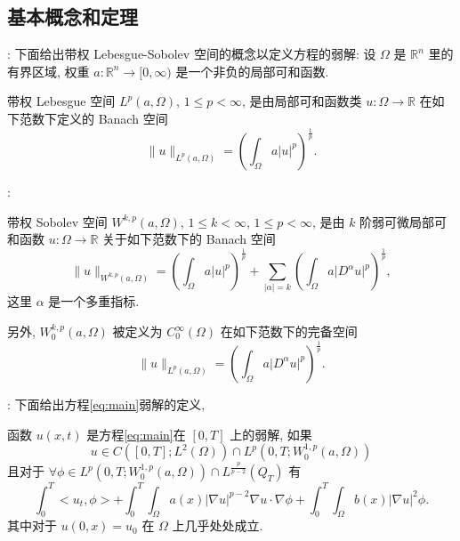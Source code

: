 \documentclass[UTF8]{ctexbeamer}
\newcommand*\abs[1]{\lvert#1\rvert}
\newcommand*\norm[1]{\lVert#1\rVert}
\newcommand\R{\mathbb{R}}
\begin{document}
\subsection{基本概念和定理}
\begin{frame}{\secname : \subsecname}
    下面给出带权 Lebesgue-Sobolev 空间的概念以定义方程的弱解:
    设 $\Omega$ 是 $\R^n$ 里的有界区域, 权重
    $a \colon \R^n \to [0, \infty)$
    是一个非负的局部可和函数.
    \begin{definition}
        带权 Lebesgue 空间 $L^p(a, \Omega)$, $1 \leq p < \infty$,
        是由局部可和函数类
        $u \colon \Omega \to \R$ 在如下范数下定义的 Banach 空间
        \begin{equation*}
            \norm{u}_{L^p(a,\Omega)} =
            \left( \int_{\Omega}a\abs{u}^p \right)^{\frac{1}{p}}.
        \end{equation*}
    \end{definition}
\end{frame}
\begin{frame}{\secname : \subsecname}
    \begin{definition}
        带权 Sobolev 空间 $W^{k,p}(a,\Omega)$,
        $1 \leq k < \infty$, $1 \leq p < \infty$,
        是由 $k$ 阶弱可微局部可和函数
        $u \colon \Omega \to \R$ 关于如下范数下的 Banach 空间
        \begin{equation*}
            \norm{u}_{W^{k,p}(a,\Omega)} =
            \left( \int_{\Omega}a\abs{u}^p \right)^{\frac{1}{p}}
            + \sum_{\abs{\alpha}=k}
            \left( \int_{\Omega}a\abs{D^{\alpha}u}^p \right)^{\frac{1}{p}},
        \end{equation*}
        这里 $\alpha$ 是一个多重指标.

        另外,
        $W_0^{k,p}(a,\Omega)$ 被定义为
        $C_0^{\infty}(\Omega)$ 在如下范数下的完备空间
        \begin{equation*}
            \norm{u}_{L^p(a,\Omega)} =
            \left( \int_{\Omega}a\abs{D^{\alpha}u}^p \right)^{\frac{1}{p}}.
        \end{equation*}
    \end{definition}
\end{frame}
\begin{frame}{\secname : \subsecname}
    下面给出方程\eqref{eq:main}弱解的定义,
    \begin{definition}
        函数 $u(x, t)$ 是方程\eqref{eq:main}在 $[0, T]$ 上的弱解, 如果
        \begin{equation*}
            u \in C([0, T]; L^2(\Omega))\cap L^p(0, T; W_0^{1,p}(a,\Omega))
        \end{equation*}
        且对于 $\forall \phi \in L^p(0, T; W_0^{1,p}(a,\Omega))\cap L^{\frac{p}{p-2}}(Q_T)$ 有
        \begin{equation*}
            \int_0^T <u_t, \phi> + \int_0^T\int_\Omega a(x)\abs{\nabla u}^{p - 2}\nabla u \cdot \nabla \phi
            + \int_0^T\int_\Omega b(x)\abs{\nabla u}^2\phi.
        \end{equation*}
        其中对于 $u(0, x) = u_0$ 在 $\Omega$ 上几乎处处成立.
    \end{definition}
\end{frame}
\end{document}
